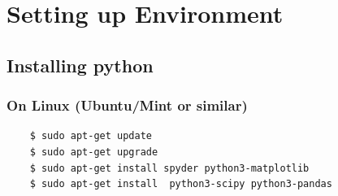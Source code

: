 \documentclass[12pt, aspectratio=169]{beamer}
\begin{document}

\section{Setting up Environment}
\subsection{Installing python}
\begin{frame}[fragile]
  \frametitle{On Linux \small{(Ubuntu/Mint or similar)}}
  \begin{verbatim}
    $ sudo apt-get update 
    $ sudo apt-get upgrade 
    $ sudo apt-get install spyder python3-matplotlib
    $ sudo apt-get install  python3-scipy python3-pandas
\end{verbatim}
\end{frame}


\end{document}
